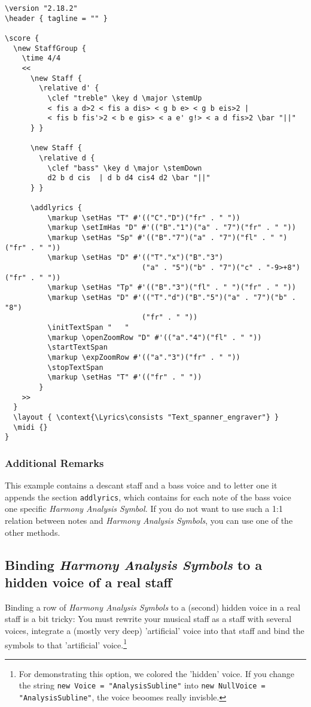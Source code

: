 \documentclass[
  DIV=calc,
  BCOR=5mm,
  12pt,
  headings=small,
  oneside,
  abstract=true,
  toc=bib,
  xcolor=dvipsnames,
  openany,
  ngerman,english]{scrartcl}
\newcommand{\has}[1]{\textit{Harmony Analysis Symbol#1}}
\begin{document}
\begin{scriptsize}
\begin{verbatim}
\version "2.18.2"
\header { tagline = "" }

\score {
  \new StaffGroup {
    \time 4/4
    <<
      \new Staff {
        \relative d' {
          \clef "treble" \key d \major \stemUp
          < fis a d>2 < fis a dis> < g b e> < g b eis>2 | 
          < fis b fis'>2 < b e gis> < a e' g!> < a d fis>2 \bar "||"
      } }   

      \new Staff {
        \relative d { 
          \clef "bass" \key d \major \stemDown
          d2 b d cis  | d b d4 cis4 d2 \bar "||"
      } }   
      
      \addlyrics {
          \markup \setHas "T" #'(("C"."D")("fr" . " "))
          \markup \setImHas "D" #'(("B"."1")("a" . "7")("fr" . " "))
          \markup \setHas "Sp" #'(("B"."7")("a" . "7")("fl" . " ")("fr" . " "))
          \markup \setHas "D" #'(("T"."x")("B"."3")
                                ("a" . "5")("b" . "7")("c" . "-9>+8")("fr" . " "))
          \markup \setHas "Tp" #'(("B"."3")("fl" . " ")("fr" . " ")) 
          \markup \setHas "D" #'(("T"."d")("B"."5")("a" . "7")("b" . "8")
                                ("fr" . " "))    
          \initTextSpan "   "
          \markup \openZoomRow "D" #'(("a"."4")("fl" . " "))
          \startTextSpan
          \markup \expZoomRow #'(("a"."3")("fr" . " ")) 
          \stopTextSpan
          \markup \setHas "T" #'(("fr" . " "))
        }
    >>
  }
  \layout { \context{\Lyrics\consists "Text_spanner_engraver"} }
  \midi {}
}
\end{verbatim}
\end{scriptsize}

\subsubsection{Additional Remarks}

This example contains a descant staff and a bass voice and to letter one it
appends the section \texttt{addlyrics}, which contains for each note of the bass
voice one specific \has. If you do not want to use such a 1:1 relation between
notes and \has{s}, you can use one of the other methods.

\subsection{Binding \has{s} to a hidden voice of a real staff}

Binding a row of \has{s} to a (second) hidden voice in a real staff is a bit
tricky: You must rewrite your musical staff as a staff with several voices,
integrate a (mostly very deep) 'artificial' voice into that staff and bind the
symbols to that 'artificial' voice.\footnote{For demonstrating this option, we
colored the 'hidden' voice. If you change the string \texttt{new Voice =
"AnalysisSubline"} into \texttt{new NullVoice = "AnalysisSubline"}, the voice
beoomes really invisble.}
\end{document}
